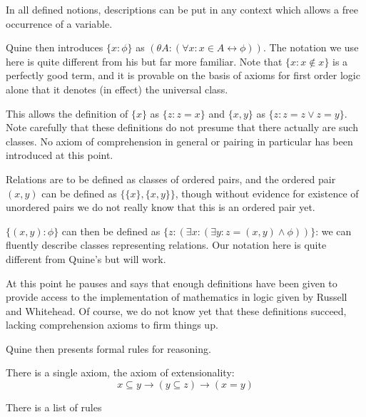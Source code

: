 \documentclass[12pt]{article}
\begin{document}
In all defined notions, descriptions can be put in any context which allows a free occurrence of a variable.

Quine then introduces $\{x:\phi\}$ as $(\theta A:(\forall x:x \in A \leftrightarrow \phi))$.  The notation we use here is quite different from his but far more familiar.  Note that $\{x:x \not\in x\}$ is a perfectly good term, and it is provable on the basis of axioms for first order logic alone that it denotes (in effect) the universal class.

This allows the definition of $\{x\}$ as $\{z:z=x\}$ and $\{x,y\}$ as $\{z:z=z\vee z=y\}$.  Note carefully that these definitions do not presume that there actually are such classes.  No axiom of comprehension in general or pairing in particular has been introduced at this point.

Relations are to be defined as classes of ordered pairs, and the ordered pair $(x,y)$ can be defined as $\{\{x\},\{x,y\}\}$, though without evidence for existence of unordered pairs we do not really know that this is an ordered pair yet.

$\{(x,y):\phi\}$ can then be defined as $\{z:(\exists x:(\exists y:z=(x,y) \wedge \phi))\}$:  we can fluently describe classes representing relations.   Our notation here is quite different from Quine's but will work.

At this point he pauses and says that enough definitions have been given to provide access to the implementation of mathematics in logic given by Russell and Whitehead.  Of course, we do not know yet that these definitions succeed, lacking comprehension axioms to firm things up.

Quine then presents formal rules for reasoning.

There is a single axiom, the axiom of extensionality: $$x \subseteq y \rightarrow (y \subseteq z) \rightarrow (x=y)$$

There is a list of rules
\end{document}
